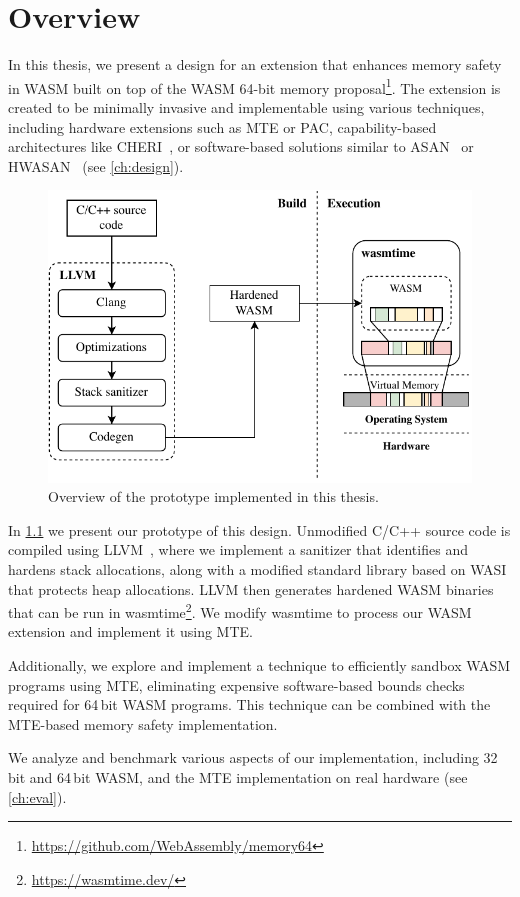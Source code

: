 \chapter{Overview}
\label{ch:overview}

In this thesis, we present a design for an extension that enhances memory safety in \ac{WASM} built on top of the \ac{WASM} 64-bit memory proposal\footnote{\url{https://github.com/WebAssembly/memory64}}.
The extension is created to be minimally invasive and implementable using various techniques, including hardware extensions such as \ac{MTE} or \ac{PAC}, capability-based architectures like \ac{CHERI}~\cite{woodruff2014cheri}, or software-based solutions similar to \ac{ASAN}~\cite{serebryany2012addresssanitizer} or \ac{HWASAN}~\cite{serebryany2018memory} (see \cref{ch:design}).


\begin{figure}[ht]
    \centering
    \includegraphics{figures/build/overview-simple}
    \caption{Overview of the prototype implemented in this thesis.}
    \label{fig:system-overview}
\end{figure}

In \cref{fig:system-overview} we present our prototype of this design.
Unmodified C/C++ source code is compiled using LLVM~\cite{lattner2004llvm}, where we implement a sanitizer that identifies and hardens stack allocations, along with a modified standard library based on \ac{WASI} that protects heap allocations.
LLVM then generates hardened \ac{WASM} binaries that can be run in wasmtime\footnote{\url{https://wasmtime.dev/}}.
We modify wasmtime to process our \ac{WASM} extension and implement it using \ac{MTE}.

Additionally, we explore and implement a technique to efficiently sandbox \ac{WASM} programs using \ac{MTE}, eliminating expensive software-based bounds checks required for 64\,bit \ac{WASM} programs.
This technique can be combined with the \ac{MTE}-based memory safety implementation.

We analyze and benchmark various aspects of our implementation, including 32\,bit and 64\,bit \ac{WASM}, and the \ac{MTE} implementation on real hardware (see \cref{ch:eval}).

